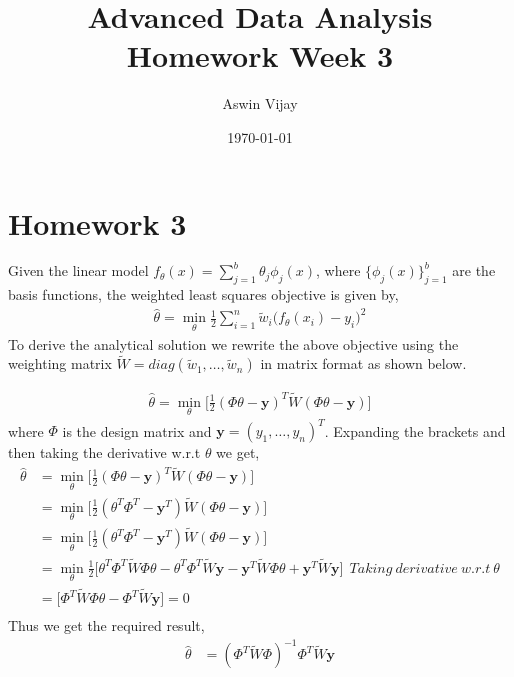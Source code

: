 \documentclass{article}
\title{Advanced Data Analysis\\Homework Week 3}
\author{Aswin Vijay}
\date\today
\begin{document}
\maketitle %

\section*{Homework 3}

Given the linear model $f_\theta(x) = \sum_{j=1}^{b}\theta_j \phi_j(x)$, where
$\{\phi_j(x)\}_{j=1}^{b}$ are the basis functions, the weighted least squares
objective is given by,
\begin{align*}
    \hat{\theta} = \min_{\theta} \frac{1}{2}\sum_{i=1}^{n} \tilde{w}_i\biggl(f_\theta(x_i)-y_i\biggr)^2
\end{align*}
To derive the analytical solution we rewrite the above objective using the weighting
matrix $\tilde{W} = diag(\tilde{w}_1,\dots,\tilde{w}_n)$ in matrix format as shown below.

\begin{align*}
    \hat{\theta} = \min_{\theta} \biggl[\frac{1}{2} (\Phi\theta - \mathbf{y})^T \tilde{W} (\Phi\theta - \mathbf{y}) \biggr]
\end{align*}
where $\Phi$ is the design matrix and $\mathbf{y} = (y_1,\dots,y_n)^T$. Expanding the brackets and then taking the 
derivative w.r.t $\theta$ we get,
\begin{align*}
    \hat{\theta} &= \min_{\theta} \biggl[\frac{1}{2} (\Phi\theta - \mathbf{y})^T \tilde{W} (\Phi\theta - \mathbf{y}) \biggr]\\
                 &= \min_{\theta} \biggl[\frac{1}{2} (\theta^T\Phi^T - \mathbf{y}^T) \tilde{W} (\Phi\theta - \mathbf{y}) \biggr]\\
                 &= \min_{\theta} \biggl[\frac{1}{2} (\theta^T\Phi^T - \mathbf{y}^T) \tilde{W} (\Phi\theta - \mathbf{y}) \biggr]\\
                 &= \min_{\theta} \frac{1}{2}  \biggl[ \theta^T\Phi^T\tilde{W}\Phi\theta-\theta^T\Phi^T\tilde{W}\mathbf{y}-\mathbf{y}^T\tilde{W}\Phi\theta+\mathbf{y}^T\tilde{W}\mathbf{y}\biggr] \ \ Taking\ derivative\ w.r.t\ \theta\\
                 &= \biggl[ \Phi^T\tilde{W}\Phi\theta-\Phi^T\tilde{W}\mathbf{y}\biggr] = 0\\
\end{align*}
Thus we get the required result,
\begin{align*}
    \hat{\theta} &= (\Phi^T\tilde{W}\Phi)^{-1}\Phi^T\tilde{W}\mathbf{y}
\end{align*}
\end{document}
